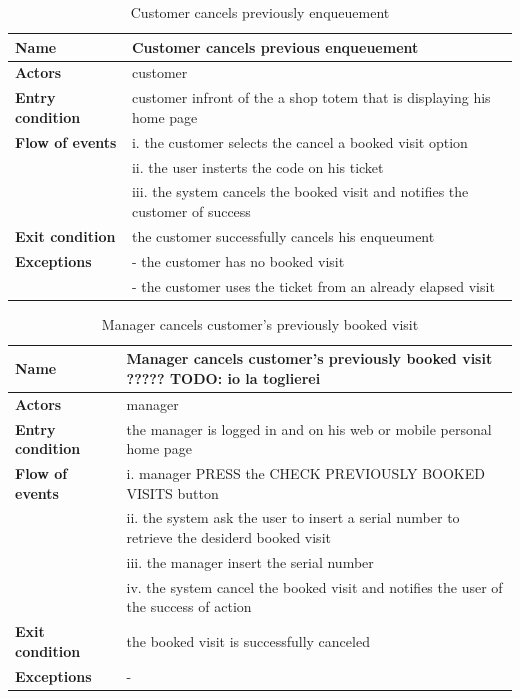 \begin{table}[h!]
    \centering
    \begin{tabular}{@{}P{0.2\textwidth}P{0.70\textwidth}@{}}
        \toprule
        \textbf{Name}                 & Customer cancels previous enqueuement\\
        \midrule
        \textbf{Actors}               & customer\\
        \textbf{Entry condition}      & customer infront of the a shop totem that is displaying his home page\\
        \textbf{Flow of events}            
        & i. the customer selects the cancel a booked visit option\\
        & ii. the user insterts the code on his ticket\\
        & iii. the system cancels the booked visit and notifies the customer of success\\
        \textbf{Exit condition}       & the customer successfully cancels his enqueument\\
        \textbf{Exceptions}           
        & - the customer has no booked visit\\
        & - the customer uses the ticket from an already elapsed visit\\
        \bottomrule
    \end{tabular}
\caption{Customer cancels previously enqueuement}
\label{table:customercnacelspreviousenqueuement}
\end{table}

\begin{table}[h!]
    \centering
    \begin{tabular}{@{}P{0.2\textwidth}P{0.70\textwidth}@{}}
        \toprule
        \textbf{Name}                 & Manager cancels customer’s previously booked visit ????? TODO: io la toglierei\\
        \midrule
        \textbf{Actors}               & manager\\
        \textbf{Entry condition}      & the manager is logged in and on his web or mobile personal home page\\
        \textbf{Flow of events}            
        & i. manager PRESS the CHECK PREVIOUSLY BOOKED VISITS button \\
        & ii. the system ask the user to insert a serial number to retrieve the desiderd booked visit\\
        & iii. the manager insert the serial number\\
        & iv. the system cancel the booked visit and notifies the user of the success of action\\
        \textbf{Exit condition}       & the booked visit is successfully canceled\\
        \textbf{Exceptions}           
        & -\\
        \bottomrule
    \end{tabular}
\caption{Manager cancels customer’s previously booked visit}
\label{table:managercancelscustomerspreviouslybookedvisit}
\end{table}

